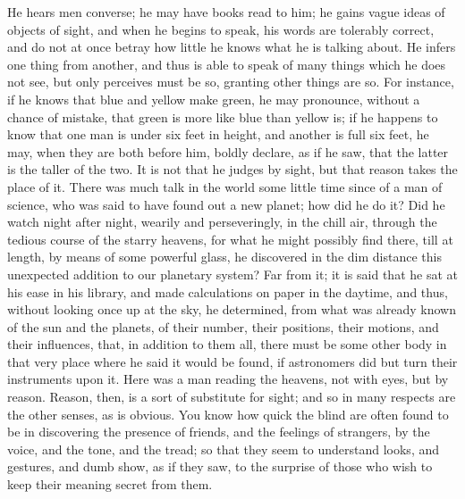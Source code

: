 He hears men converse; he may have books read to him; he gains
vague ideas of objects of sight, and when he begins to speak, his
words are tolerably correct, and do not at once betray how little he
knows what he is talking about. He infers one thing from another, and
thus is able to speak of many things which he does not see, but only
perceives must be so, granting other things are so. For instance, if
he knows that blue and yellow make green, he may pronounce, without a
chance of mistake, that green is more like blue than yellow is; if he
happens to know that one man is under six feet in height, and another
is full six feet, he may, when they are both before him, boldly
declare, as if he saw, that the latter is the taller of the two. It is
not that he judges by sight, but that reason takes the place of it.
There was much talk in the world some little time since of a man of
science, who was said to have found out a new planet; how did he do
it? Did he watch night after night, wearily and perseveringly, in the
chill air, through the tedious course of the starry heavens, for what
he might possibly find there, till at length, by means of some
powerful glass, he discovered in the dim distance this unexpected
addition to our planetary system? Far from it; it is said that he sat
at his ease in his library, and made calculations on paper in the
daytime, and thus, without looking once up at the sky, he determined,
from what was already known of the sun and the planets, of their
number, their positions, their motions, and their influences, that, in
addition to them all, there must be some other body in that very place
where he said it would be found, if astronomers did but turn their
instruments upon it. Here was a man reading the heavens, not with
eyes, but by reason. Reason, then, is a sort of substitute for sight;
and so in many respects are the other senses, as is obvious. You know
how quick the blind are often found to be in discovering the presence
of friends, and the feelings of strangers, by the voice, and the tone,
and the tread; so that they seem to understand looks, and gestures,
and dumb show, as if they saw, to the surprise of those who wish to
keep their meaning secret from them.

